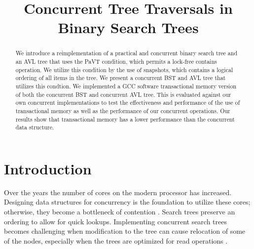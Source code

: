 \documentclass[conference]{IEEEtran}
\theoremstyle{definition}
\theoremstyle{theorem}
\begin{document}
\title{Concurrent Tree Traversals in Binary Search Trees\\
}

\author{
\and
{}
}

\maketitle

\begin{abstract}
We introduce a reimplementation of a practical and concurrent binary search tree and an AVL tree that uses the PaVT condition, which permits a lock-free contains operation. We utilize this condition by the use of snapshots, which contains a logical ordering of all items in the tree. We present a concurrent BST and AVL tree that utilizes this condtion. We implemented a GCC software transactional memory version of both the concurrent BST and concurrent AVL tree. This is evaluated against our own concurrent implementations to test the effectiveness and performance of the use of transactional memory as well as the performance of our concurrent operations. Our results show that transactional memory has a lower performance than the concurrent data structure.
\end{abstract}

\section{Introduction}
Over the years the number of cores on the modern processor has increased. Designing data structures for concurrency is the foundation to utilize these cores; otherwise, they become a bottleneck of contention \cite{crain-cont}. Search trees preserve an ordering to allow for quick lookups. Implementing concurrent search trees becomes challenging when modification to the tree can cause relocation of some of the nodes, especially when the trees are optimized for read operations \cite{pavt}.
\end{document}
